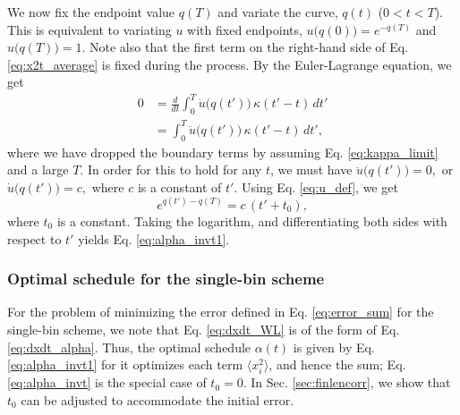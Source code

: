 \documentclass[reprint, floatfix]{revtex4-1}
\begin{document}
We now fix the endpoint value $q(T)$
and variate the curve, $q(t)$ ($0 < t < T$).
%
This is equivalent to variating $u$
with fixed endpoints,
$u\bigl( q(0) \bigr)  = e^{- q(T)}$
and
$u\bigl( q(T) \bigr) = 1$.
%
Note also that the first term on the right-hand side
of Eq. \eqref{eq:x2t_average} is fixed during
the process.
%
%
By the Euler-Lagrange equation, we get
$$
\begin{aligned}
0
&=
\frac{d}{dt} \int_0^T
  \dot u\bigl( q(t') \bigr) \, \kappa(t' - t) \, dt'
\\
&= \int_0^T
  \ddot u\bigl( q(t') \bigr) \, \kappa(t' - t) \, dt',
\end{aligned}
$$
where we have dropped the boundary terms
by assuming Eq. \eqref{eq:kappa_limit}
and a large $T$.
%
%
In order for this to hold for any $t$,
we must have
%
$
\ddot u\bigl( q(t') \bigr) = 0
,
$
or
$
\dot u\bigl( q(t') \bigr) = c
,
$
%
where $c$ is a constant of $t'$.
%
Using Eq. \eqref{eq:u_def},
we get
$$
e^{ q(t') - q(T) }
=
c \, (t' + t_0),
$$
where $t_0$ is a constant.
%
Taking the logarithm,
and differentiating both sides
with respect to $t'$
yields Eq. \eqref{eq:alpha_invt1}.



\subsubsection{Optimal schedule for the single-bin scheme}



For the problem of
minimizing the error defined in Eq. \eqref{eq:error_sum}
for the single-bin scheme,
we note that Eq. \eqref{eq:dxdt_WL}
is of the form of Eq. \eqref{eq:dxdt_alpha}.
%
Thus,
the optimal schedule $\alpha(t)$ is given by
Eq. \eqref{eq:alpha_invt1}
for it optimizes each term $\langle x_i^2 \rangle$,
and hence the sum;
Eq. \eqref{eq:alpha_invt}
is the special case of $t_0 = 0$.
%
In Sec. \ref{sec:finlencorr},
we show that $t_0$ can be adjusted
to accommodate the initial error.
\end{document}
